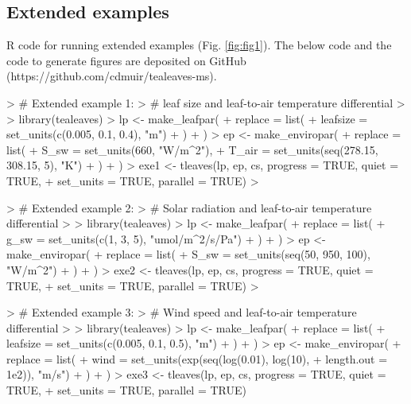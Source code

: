 \documentclass[11pt, oneside]{article}
\begin{document}
\clearpage


\subsection*{Extended examples}

R code for running extended examples (Fig. \ref{fig:fig1}). The below code and the code to generate figures are deposited on GitHub (https://github.com/cdmuir/tealeaves-ms).
 
\begin{Schunk}
\begin{Sinput}
> # Extended example 1: 
> # leaf size and leaf-to-air temperature differential
> 
> library(tealeaves)
> lp  <- make_leafpar(
+   replace = list(
+     leafsize = set_units(c(0.005, 0.1, 0.4), "m")
+   )
+ )
> ep <- make_enviropar(
+   replace = list(
+     S_sw = set_units(660, "W/m^2"),
+     T_air = set_units(seq(278.15, 308.15, 5), "K")
+   )
+ )
> exe1 <- tleaves(lp, ep, cs, progress = TRUE, quiet = TRUE, 
+                 set_units = TRUE, parallel = TRUE)
> 
\end{Sinput}
\end{Schunk}

\clearpage

\begin{Schunk}
\begin{Sinput}
> # Extended example 2: 
> # Solar radiation and leaf-to-air temperature differential
> 
> library(tealeaves)
> lp  <- make_leafpar(
+   replace = list(
+     g_sw = set_units(c(1, 3, 5), "umol/m^2/s/Pa")
+   )
+ )
> ep <- make_enviropar(
+   replace = list(
+     S_sw = set_units(seq(50, 950, 100), "W/m^2")
+   )
+ )
> exe2 <- tleaves(lp, ep, cs, progress = TRUE, quiet = TRUE, 
+                 set_units = TRUE, parallel = TRUE)
> 
\end{Sinput}
\end{Schunk}

\clearpage

\begin{Schunk}
\begin{Sinput}
> # Extended example 3: 
> # Wind speed and leaf-to-air temperature differential
> 
> library(tealeaves)
> lp  <- make_leafpar(
+   replace = list(
+     leafsize = set_units(c(0.005, 0.1, 0.5), "m")
+   )
+ )
> ep <- make_enviropar(
+   replace = list(
+     wind = set_units(exp(seq(log(0.01), log(10), 
+                              length.out = 1e2)), "m/s")
+   )
+ )
> exe3 <- tleaves(lp, ep, cs, progress = TRUE, quiet = TRUE, 
+                 set_units = TRUE, parallel = TRUE)
\end{Sinput}
\end{Schunk}
\end{document}
